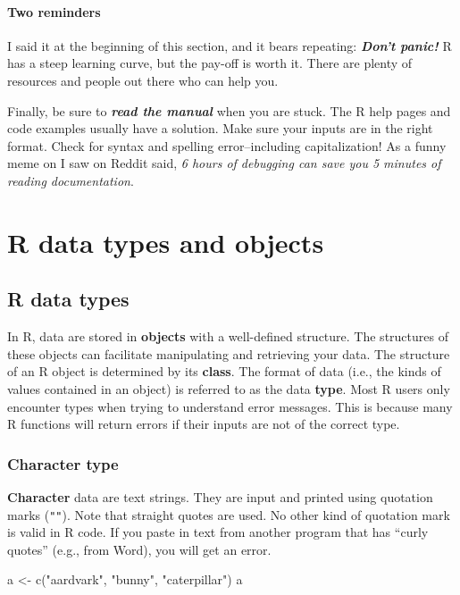 \documentclass[
  13,
  letterpaper,
]{report}
\newenvironment{Shaded}{\begin{snugshade}}{\end{snugshade}}
\newcommand{\FunctionTok}[1]{\textcolor[rgb]{0.28,0.35,0.67}{#1}}
\newcommand{\NormalTok}[1]{\textcolor[rgb]{0.00,0.23,0.31}{#1}}
\newcommand{\OtherTok}[1]{\textcolor[rgb]{0.00,0.23,0.31}{#1}}
\newcommand{\StringTok}[1]{\textcolor[rgb]{0.13,0.47,0.30}{#1}}
\begin{document}
\subsubsection{Two reminders}\label{sec-r-faq-help-two}

I said it at the beginning of this section, and it bears repeating:
\textbf{\emph{Don't panic!}} R has a steep learning curve, but the
pay-off is worth it. There are plenty of resources and people out there
who can help you.

Finally, be sure to \textbf{\emph{read the manual}} when you are stuck.
The R help pages and code examples usually have a solution. Make sure
your inputs are in the right format. Check for syntax and spelling
error--including capitalization! As a funny meme on I saw on Reddit
said, \emph{6 hours of debugging can save you 5 minutes of reading
documentation}.

\chapter{R data types and objects}\label{sec-object}

\section{R data types}\label{sec-object-type}

In R, data are stored in \textbf{objects} with a well-defined structure.
The structures of these objects can facilitate manipulating and
retrieving your data. The structure of an R object is determined by its
\textbf{class}. The format of data (i.e., the kinds of values contained
in an object) is referred to as the data \textbf{type}. Most R users
only encounter types when trying to understand error messages. This is
because many R functions will return errors if their inputs are not of
the correct type.

\subsection{Character type}\label{character-type}

\textbf{Character} data are text strings. They are input and printed
using quotation marks (\texttt{""}). Note that straight quotes are used.
No other kind of quotation mark is valid in R code. If you paste in text
from another program that has ``curly quotes'' (e.g., from Word), you
will get an error.

\begin{Shaded}
\begin{Highlighting}[]
\NormalTok{a }\OtherTok{\textless{}{-}} \FunctionTok{c}\NormalTok{(}\StringTok{"aardvark"}\NormalTok{, }\StringTok{"bunny"}\NormalTok{, }\StringTok{"caterpillar"}\NormalTok{)}
\NormalTok{a}
\end{Highlighting}
\end{Shaded}
\end{document}
